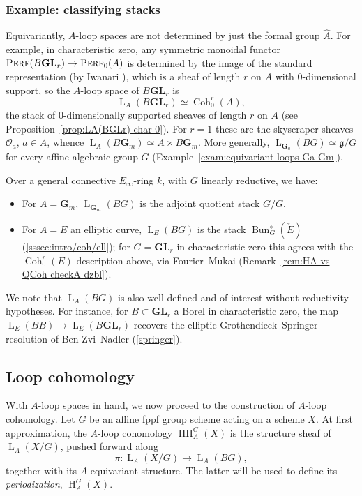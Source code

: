 \documentclass[12pt, oneside]{amsart}
\numberwithin{equation}{section}
\theoremstyle{remark}
\theoremstyle{plain}
\DeclareMathOperator{\Perf}{\textsc{Perf}}
\newcommand{\Loop}{\operatorname{L}}
\newcommand{\OO}{\mathcal{O}}
\newcommand{\GGa}{\mathbf{G}_{a}}
\newcommand{\GGm}{\mathbf{G}_{m}}
\newcommand{\GL}{\mathbf{GL}}
\newcommand{\HH}{\operatorname{HH}}
\newcommand{\Hcoh}{\operatorname{H}}
\newcommand{\Bun}{\operatorname{Bun}}
\begin{document}
\subsubsection{Example: classifying stacks}\label{sssec:intro/coh/BG}
Equivariantly, $A$-loop spaces are not determined by just the formal group $\widehat{A}$.
For example, in characteristic zero, any symmetric monoidal functor $\Perf(B\GL_r) \to \Perf_0(A)$ is determined by the image of the standard representation (by Iwanari \cite{Iwa}), which is a sheaf of length $r$ on $A$ with $0$-dimensional support, so the $A$-loop space of $B\GL_r$ is
\[ \Loop_A(B\GL_r) \simeq \operatorname{Coh}_0^r(A), \]
the stack of $0$-dimensionally supported sheaves of length $r$ on $A$ (see Proposition~\ref{prop:LA(BGLr) char 0}).
For $r=1$ these are the skyscraper sheaves $\OO_a$, $a \in A$, whence $\Loop_A(B\GGm) \simeq A \times B\GGm$.
More generally, $\Loop_{\GGa}(BG) \simeq \mathfrak{g}/G$ for every affine algebraic group $G$ (Example~\ref{exam:equivariant loops Ga Gm}).

Over a general connective $E_\infty$-ring $k$, with $G$ linearly reductive, we have:
\begin{itemize}
\item For $A=\GGm$, $\Loop_{\GGm}(BG)$ is the adjoint quotient stack $G/G$.
\item For $A=E$ an elliptic curve, $\Loop_E(BG)$ is the stack $\Bun_G^\diamond(\check{E})$ (\ref{sssec:intro/coh/ell}); for $G=\GL_r$ in characteristic zero this agrees with the $\operatorname{Coh}_0^r(E)$ description above, via Fourier--Mukai (Remark~\ref{rem:HA vs QCoh checkA dzbl}).
\end{itemize}
We note that $\Loop_A(BG)$ is also well-defined and of interest without reductivity hypotheses.
For instance, for $B \subset \GL_r$ a Borel in characteristic zero, the map $\Loop_E(BB) \to \Loop_E(B\GL_r)$ recovers the elliptic Grothendieck--Springer resolution of Ben-Zvi--Nadler \cite[\S 2]{BNEll} (\ref{springer}).

\subsection{Loop cohomology}\label{ssec:intro/shv}

With $A$-loop spaces in hand, we now proceed to the construction of $A$-loop cohomology.
Let $G$ be an affine fppf group scheme acting on a scheme $X$.
At first approximation, the $A$-loop cohomology $\HH_A^G(X)$ is the structure sheaf of $\Loop_A(X/G)$, pushed forward along
\[ \pi : \Loop_A(X/G) \to \Loop_A(BG), \]
together with its $\check{A}$-equivariant structure.
The latter will be used to define its \emph{periodization}, $\Hcoh_A^G(X)$.
\end{document}
